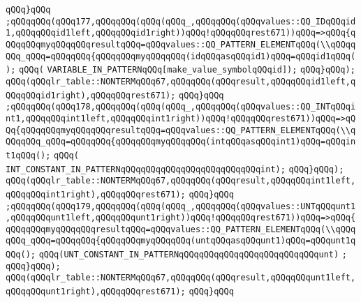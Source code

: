\verb|qQQq}qQQq|\newline
\verb|;qQQqqQQq(qQQq177,qQQqqQQq(qQQq(qQQq_,qQQqqQQq(qQQqvalues::QQ_IDqQQqid1,qQQqqQQqid1left,qQQqqQQqid1right))qQQq!qQQqqQQqrest671))qQQq=>qQQq{qQQqqQQqmyqQQqqQQqresultqQQq=qQQqvalues::QQ_PATTERN_ELEMENTqQQq(\\qQQqqQQq_qQQq=qQQqqQQq{qQQqqQQqmyqQQqqQQq(idqQQqasqQQqid1)qQQq=qQQqid1qQQq();|\newline
\verb|qQQq(|\newline
\verb|VARIABLE_IN_PATTERNqQQq[make_value_symbolqQQqid]);|\newline
\verb|qQQq}qQQq);|\newline
\verb|qQQq(qQQqlr_table::NONTERMqQQq67,qQQqqQQq(qQQqresult,qQQqqQQqid1left,qQQqqQQqid1right),qQQqqQQqrest671);|\newline
\verb|qQQq}qQQq|\newline
\verb|;qQQqqQQq(qQQq178,qQQqqQQq(qQQq(qQQq_,qQQqqQQq(qQQqvalues::QQ_INTqQQqint1,qQQqqQQqint1left,qQQqqQQqint1right))qQQq!qQQqqQQqrest671))qQQq=>qQQq{qQQqqQQqmyqQQqqQQqresultqQQq=qQQqvalues::QQ_PATTERN_ELEMENTqQQq(\\qQQqqQQq_qQQq=qQQqqQQq{qQQqqQQqmyqQQqqQQq(intqQQqasqQQqint1)qQQq=qQQqint1qQQq();|\newline
\verb|qQQq(|\newline
\verb|INT_CONSTANT_IN_PATTERNqQQqqQQqqQQqqQQqqQQqqQQqqQQqint);|\newline
\verb|qQQq}qQQq);|\newline
\verb|qQQq(qQQqlr_table::NONTERMqQQq67,qQQqqQQq(qQQqresult,qQQqqQQqint1left,qQQqqQQqint1right),qQQqqQQqrest671);|\newline
\verb|qQQq}qQQq|\newline
\verb|;qQQqqQQq(qQQq179,qQQqqQQq(qQQq(qQQq_,qQQqqQQq(qQQqvalues::UNTqQQqunt1,qQQqqQQqunt1left,qQQqqQQqunt1right))qQQq!qQQqqQQqrest671))qQQq=>qQQq{qQQqqQQqmyqQQqqQQqresultqQQq=qQQqvalues::QQ_PATTERN_ELEMENTqQQq(\\qQQqqQQq_qQQq=qQQqqQQq{qQQqqQQqmyqQQqqQQq(untqQQqasqQQqunt1)qQQq=qQQqunt1qQQq();|\newline
\verb|qQQq(UNT_CONSTANT_IN_PATTERNqQQqqQQqqQQqqQQqqQQqqQQqqQQqunt)|\newline
\verb|;|\newline
\verb|qQQq}qQQq);|\newline
\verb|qQQq(qQQqlr_table::NONTERMqQQq67,qQQqqQQq(qQQqresult,qQQqqQQqunt1left,qQQqqQQqunt1right),qQQqqQQqrest671);|\newline
\verb|qQQq}qQQq|\newline
